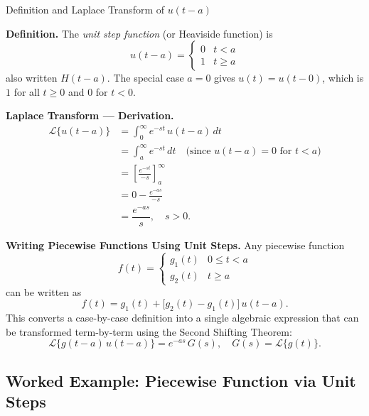 \documentclass[12pt,a4paper]{article}
\begin{document}
\begin{infobox}{Definition and Laplace Transform of $u(t-a)$}

\textbf{Definition.} The \emph{unit step function} (or Heaviside function) is
\[
  u(t - a) = \begin{cases} 0 & t < a \\ 1 & t \geq a \end{cases}
\]
also written $H(t-a)$. The special case $a = 0$ gives $u(t) = u(t-0)$, which is
$1$ for all $t \geq 0$ and $0$ for $t < 0$.

\medskip
\textbf{Laplace Transform --- Derivation.}
\begin{align*}
  \mathcal{L}\{u(t-a)\}
  &= \int_0^{\infty} e^{-st}\, u(t-a)\, dt \\
  &= \int_a^{\infty} e^{-st}\, dt
     \quad \text{(since } u(t-a) = 0 \text{ for } t < a\text{)} \\
  &= \left[ \frac{e^{-st}}{-s} \right]_a^{\infty} \\
  &= 0 - \frac{e^{-as}}{-s} \\[4pt]
  &= \boxed{\dfrac{e^{-as}}{s}}, \quad s > 0.
\end{align*}

\medskip
\textbf{Writing Piecewise Functions Using Unit Steps.}
Any piecewise function
\[
  f(t) = \begin{cases} g_1(t) & 0 \leq t < a \\ g_2(t) & t \geq a \end{cases}
\]
can be written as
\[
  f(t) = g_1(t) + \bigl[g_2(t) - g_1(t)\bigr]\, u(t-a).
\]
This converts a case-by-case definition into a single algebraic expression that
can be transformed term-by-term using the Second Shifting Theorem:
\[
  \mathcal{L}\{g(t-a)\,u(t-a)\} = e^{-as}\,G(s), \quad G(s) =
  \mathcal{L}\{g(t)\}.
\]

\end{infobox}

\subsection{Worked Example: Piecewise Function via Unit Steps}
\end{document}
